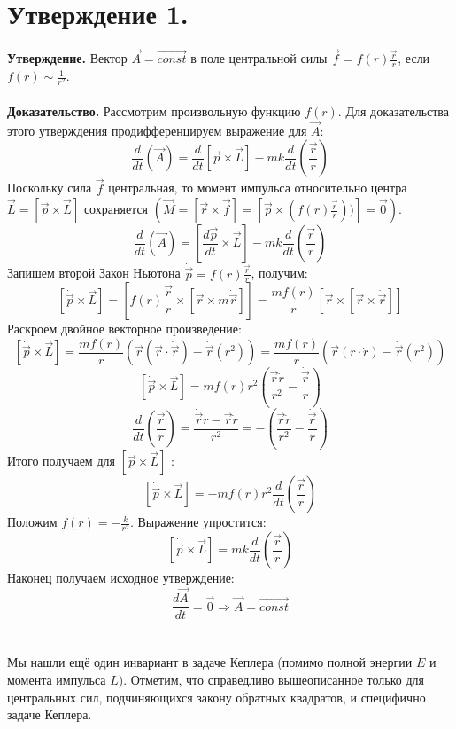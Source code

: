 \documentclass[a4paper,12pt]{article}
\begin{document}
\section*{Утверждение 1.}
\textbf{Утверждение.} Вектор $\vec{A} = \vec{const}$ в поле центральной силы $\vec{f} = f(r)\frac{\vec{r}}{r}$, если $f(r) \sim \frac{1}{r^2}$.
\\\\
\textbf{Доказательство.}
Рассмотрим произвольную функцию $f(r)$. Для доказательства этого утверждения продифференцируем выражение для $\vec{A}$:
\[\frac{d}{dt}(\vec{A}) = \frac{d}{dt}\left[ \vec{p}\times \vec{L}\right] -mk \frac{d}{dt}\left(\frac{\vec{r}}{r}\right)\]
Поскольку сила $\vec{f}$ центральная, то момент импульса относительно центра $\vec{L} = \left[\vec{p}\times \vec{L} \right]$ сохраняется $(\vec{M} = \left[\vec{r}\times \vec{f} \right] = \left[\vec{p}\times (f(r)\frac{\vec{r}}{r})) \right] = \vec{0})$.
\[\frac{d}{dt}(\vec{A}) = \left[\frac{d\vec{p}}{dt}\times \vec{L}\right] -mk \frac{d}{dt}\left(\frac{\vec{r}}{r}\right)\]
Запишем второй Закон Ньютона $\dot{\vec{p}} = f(r)\frac{\vec{r}}{r}$, получим:
\[\left[ \dot{\vec{p}}\times \vec{L}\right] = \left[f(r)\frac{\vec{r}}{r} \times \left[\vec{r} \times m\dot{\vec{r}} \right]  \right] = \frac{mf(r)}{r}\left[ \vec{r} \times \left[ \vec{r} \times \dot{\vec{r}}\right]\right]\]
Раскроем двойное векторное произведение:
\[\left[ \dot{\vec{p}}\times \vec{L}\right] = \frac{mf(r)}{r}\left(\vec{r}(\vec{r}\cdot\dot{\vec{r}}) - \dot{\vec{r}}(r^2) \right) = \frac{mf(r)}{r}\left(\vec{r}(r\cdot\dot{r}) - \dot{\vec{r}}(r^2) \right) \]
\[\left[ \dot{\vec{p}}\times \vec{L}\right] = mf(r)r^2 \left( \frac{\vec{r}\dot{r}}{r^2} - \frac{\dot{\vec{r}}}{r}\right) \]
\[\frac{d}{dt}(\frac{\vec{r}}{r}) = \frac{\dot{\vec{r}}r - \vec{r}\dot{r}}{r^2} = -\left(\frac{\vec{r}\dot{r}}{r^2} -\frac{\dot{\vec{r}}}{r}\right)\]
Итого получаем для $\left[ \dot{\vec{p}}\times \vec{L}\right]$ :
\[\left[ \dot{\vec{p}}\times \vec{L}\right] = -mf(r)r^2\frac{d}{dt}\left(\frac{\vec{r}}{r}\right) \]
Положим $f(r) = -\frac{k}{r^2}$. Выражение упростится:
\[\left[ \dot{\vec{p}}\times \vec{L}\right] = mk\frac{d}{dt}\left(\frac{\vec{r}}{r}\right) \]
Наконец получаем исходное утверждение:
\[\frac{d\vec{A}}{dt} = \vec{0} \Rightarrow \vec{A} = \vec{const}\]
\\\\
Мы нашли ещё один инвариант в задаче Кеплера (помимо полной энергии $E$ и момента импульса $L$). Отметим, что справедливо вышеописанное только для центральных сил, подчиняющихся закону обратных квадратов, и специфично задаче Кеплера.
\end{document}
